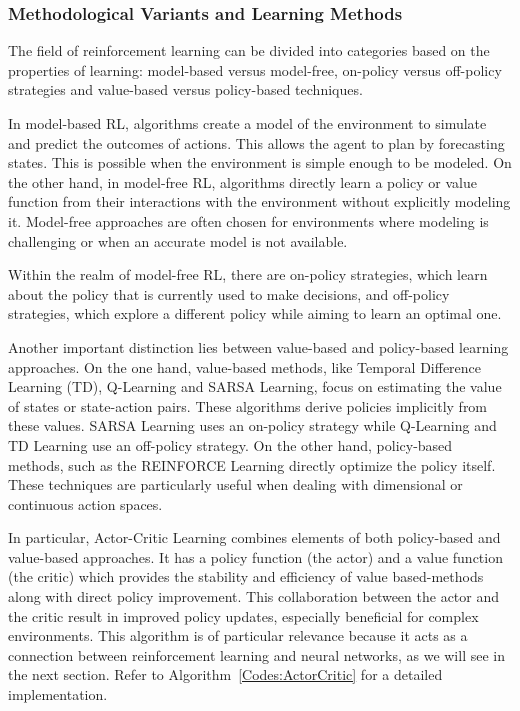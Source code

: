 \subsubsection{Methodological Variants and Learning Methods}
The field of reinforcement learning can be divided into categories based on the properties of learning: model-based versus model-free, on-policy versus off-policy strategies and value-based versus policy-based techniques.

In model-based RL, algorithms create a model of the environment to simulate and predict the outcomes of actions. This allows the agent to plan by forecasting states. This is possible when the environment is simple enough to be modeled. On the other hand, in model-free RL, algorithms directly learn a policy or value function from their interactions with the environment without explicitly modeling it. Model-free approaches are often chosen for environments where modeling is challenging or when an accurate model is not available.

Within the realm of model-free RL, there are on-policy strategies, which learn about the policy that is currently used to make decisions, and off-policy strategies, which explore a different policy while aiming to learn an optimal one.

Another important distinction lies between value-based and policy-based learning approaches. On the one hand, value-based methods, like Temporal Difference Learning (TD), Q-Learning and SARSA Learning, focus on estimating the value of states or state-action pairs. These algorithms derive policies implicitly from these values. SARSA Learning uses an on-policy strategy while Q-Learning and TD Learning use an off-policy strategy. On the other hand, policy-based methods, such as the REINFORCE Learning directly optimize the policy itself. These techniques are particularly useful when dealing with dimensional or continuous action spaces. 

In particular, Actor-Critic Learning combines elements of both policy-based and value-based approaches. It has a policy function (the actor) and a value function (the critic) which provides the stability and efficiency of value based-methods along with direct policy improvement. This collaboration between the actor and the critic result in improved policy updates, especially beneficial for complex environments. This algorithm is of particular relevance because it acts as a connection between reinforcement learning and neural networks, as we will see in the next section. Refer to Algorithm~\ref{Codes:ActorCritic} for a detailed implementation.

